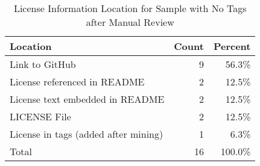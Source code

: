 \begin{table}[]
\caption{License Information Location for Sample with No Tags after Manual Review}
\label{tab:manual_analysis}
\begin{tabular}{lrr}
\hline
\textbf{Location} & \multicolumn{1}{l}{\textbf{Count}} & \multicolumn{1}{l}{\textbf{Percent}} \\ \hline
Link to GitHub & 9 & 56.3\% \\
License referenced in README & 2 & 12.5\% \\
License text embedded in README & 2 & 12.5\% \\
LICENSE File & 2 & 12.5\% \\
License in tags (added after mining) & 1 & 6.3\% \\ \hline
Total & 16 & 100.0\%\\
\hline
\end{tabular}%
\end{table}
